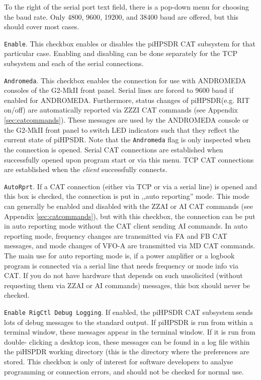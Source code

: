\documentclass[12pt]{book}
\def\rett#1{\texttt{\color{red}#1}}
\def\pH{pi\-HPSDR\xspace}
\begin{document}
To the right of the serial port text field, there is a pop-down menu for choosing the baud rate. Only 4800,
9600, 19200, and 38400 baud are offered, but this should cover most cases.

\rett{Enable}. This checkbox enables or disables the \pH CAT subsystem for that particular case.
Enabling and disabling can be done separately for the TCP subsystem and each of the serial
connections.

\rett{Andromeda}. This checkbox enables the connection for use with ANDROMEDA consoles
of the G2-MkII front panel. Serial lines are
forced to 9600 baud if enabled for ANDROMEDA. Furthermore, status changes of \pH (e.g. RIT on/off) are
automatically reported via ZZZI CAT commands (see Appendix \ref{sec:catcommands}). These messages are
used by the ANDROMEDA console or the G2-MkII front panel
to switch LED indicators such that they reflect the current state
of \pH. Note that the \rett{Andromeda} flag is only inspected when the connection is opened. Serial CAT connections
are established when successfully opened upon program start or via this menu.
TCP CAT connections are established when the \textit{client} successfully connects.

\rett{AutoRprt}. If a CAT connection (either via TCP or via a serial line) is opened and this box is checked,
the connection is put in ,,auto reporting'' mode. This mode can generally be enabled and disabled with the
ZZAI or AI CAT commands (see Appendix \ref{sec:catcommands}), but with this checkbox, the connection can be put
in auto reporting mode without the CAT client sending AI commands. In auto reporting mode, frequency changes
are transmitted via FA and FB CAT messages, and mode changes of VFO-A are transmitted via MD CAT commands.
The main use for auto reporting mode is, if a power amplifier or a logbook program
is connected via a serial line that needs frequency or mode  info via CAT. If you do not have hardware that depends
on such unsolicited (without requesting them via ZZAI or AI commands) messages, this box should never be checked.

\rett{Enable RigCtl Debug Logging}. If enabled, the \pH CAT subsystem sends lots of debug messages to the standard output. If
\pH is run
from within a terminal window, these messages appear in the terminal window. If it is run from double-
clicking a desktop icon,
these messages can be found in a log file within the piHSPDR working directory (this is the directory where
the preferences
are stored. This checkbox is only of interest for software developers to analyse programming or connection
errors, and should
not be checked for normal use.
\end{document}
